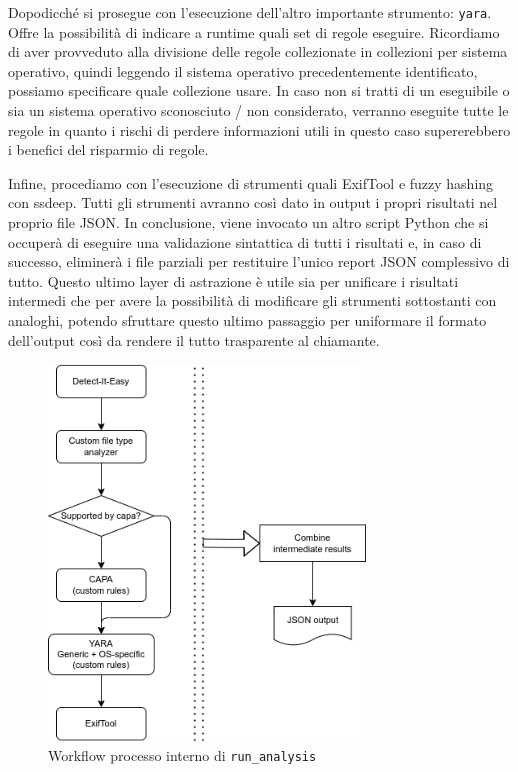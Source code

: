 Dopodicché si prosegue con l'esecuzione dell'altro importante strumento: \texttt{yara}. Offre la possibilità di indicare a runtime quali set di regole eseguire. Ricordiamo di aver provveduto alla divisione delle regole collezionate in collezioni per sistema operativo, quindi leggendo il sistema operativo precedentemente identificato, possiamo specificare quale collezione usare. In caso non si tratti di un eseguibile o sia un sistema operativo sconosciuto / non considerato, verranno eseguite tutte le regole in quanto i rischi di perdere informazioni utili in questo caso supererebbero i benefici del risparmio di regole.

Infine, procediamo con l'esecuzione di strumenti quali ExifTool e fuzzy hashing con ssdeep.
Tutti gli strumenti avranno così dato in output i propri risultati nel proprio file JSON. In conclusione, viene invocato un altro script Python che si occuperà di eseguire una validazione sintattica di tutti i risultati e, in caso di successo, eliminerà i file parziali per restituire l'unico report JSON complessivo di tutto.
Questo ultimo layer di astrazione è utile sia per unificare i risultati intermedi che per avere la possibilità di modificare gli strumenti sottostanti con analoghi, potendo sfruttare questo ultimo passaggio per uniformare il formato dell'output così da rendere il tutto trasparente al chiamante.

\begin{figure}[htbp]
    \centering
    \includegraphics[width=0.75\textwidth]{assets/static_run_analysis_internal_tools.png}
    \caption{Workflow processo interno di \texttt{run\_analysis}}
    \label{fig:static_analysis_internal_tools_workflow}
\end{figure}

